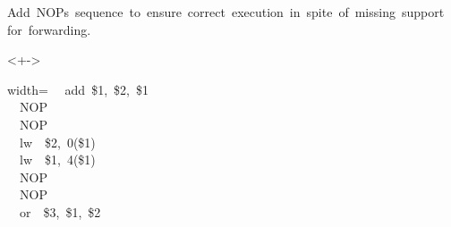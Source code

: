 \documentclass[xcolor=table]{beamer}
\begin{document}
\begin{mdframe}
\noindent{} Add  NOPs  sequence  to  ensure  correct  execution  in  spite  of  missing  support  for  forwarding.%

\mdhr{}%

\begin{onlyenv}<+->%
\begin{mdcenter}%
\begin{mdpre}%
\begin{mdblock}{width=}%
\noindent~~{add}~\$1,~\$2,~\$1\\
~~{NOP}\\
~~{NOP}\\
~~{lw}~~\$2,~{0}(\$1)\\
~~{lw}~~\$1,~{4}(\$1)\\
~~{NOP}\\
~~{NOP}\\
~~{or}~~\$3,~\$1,~\$2%
\end{mdblock}%
\end{mdpre}%
\end{mdcenter}%
\end{onlyenv}%
\end{mdframe}\label{sec-hw-5-13}%
\end{document}
